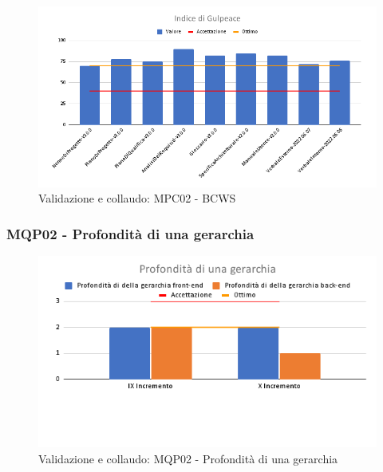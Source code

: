 \begin{figure}[H]
    \centering
    \includegraphics[scale=0.50]{Sezioni/images/last_prodotto/Indice_di_Gulpeace.png}
    \caption{Validazione e collaudo: MPC02 - BCWS}
\end{figure}
\subsubsection{MQP02 - Profondità di una gerarchia}
\begin{figure}[H]
    \centering
    \includegraphics[scale=0.50]{Sezioni/images/last_prodotto/Profondita_di_una_gerarchia.png}
    \caption{Validazione e collaudo: MQP02 - Profondità di una gerarchia}
\end{figure}
